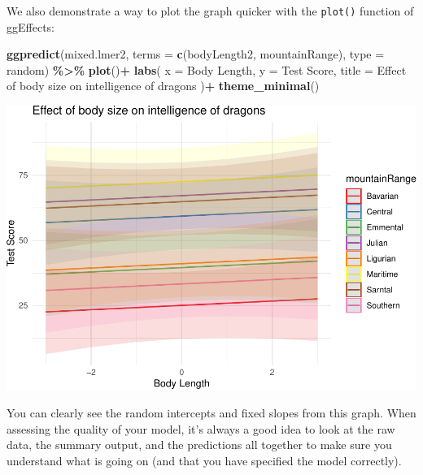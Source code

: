 \documentclass[
]{article}
\newenvironment{Shaded}{\begin{snugshade}}{\end{snugshade}}
\newcommand{\AttributeTok}[1]{\textcolor[rgb]{0.13,0.29,0.53}{#1}}
\newcommand{\FunctionTok}[1]{\textcolor[rgb]{0.13,0.29,0.53}{\textbf{#1}}}
\newcommand{\NormalTok}[1]{#1}
\newcommand{\SpecialCharTok}[1]{\textcolor[rgb]{0.81,0.36,0.00}{\textbf{#1}}}
\newcommand{\StringTok}[1]{\textcolor[rgb]{0.31,0.60,0.02}{#1}}
\begin{document}
We also demonstrate a way to plot the graph quicker with the
\texttt{plot()} function of ggEffects:

\begin{Shaded}
\begin{Highlighting}[]
\FunctionTok{ggpredict}\NormalTok{(mixed.lmer2, }\AttributeTok{terms =} \FunctionTok{c}\NormalTok{(}\StringTok{\textquotesingle{}bodyLength2\textquotesingle{}}\NormalTok{, }\StringTok{\textquotesingle{}mountainRange\textquotesingle{}}\NormalTok{), }\AttributeTok{type =} \StringTok{\textquotesingle{}random\textquotesingle{}}\NormalTok{) }\SpecialCharTok{\%\textgreater{}\%} 
  \FunctionTok{plot}\NormalTok{()}\SpecialCharTok{+}
  \FunctionTok{labs}\NormalTok{(}
    \AttributeTok{x =} \StringTok{\textquotesingle{}Body Length\textquotesingle{}}\NormalTok{,}
    \AttributeTok{y =} \StringTok{\textquotesingle{}Test Score\textquotesingle{}}\NormalTok{,}
    \AttributeTok{title =} \StringTok{\textquotesingle{}Effect of body size on intelligence of dragons\textquotesingle{}}
\NormalTok{  )}\SpecialCharTok{+}
  \FunctionTok{theme\_minimal}\NormalTok{()}
\end{Highlighting}
\end{Shaded}

\includegraphics{Introduction-to-linear-mixed-models_files/figure-latex/unnamed-chunk-26-1.pdf}

You can clearly see the random intercepts and fixed slopes from this
graph. When assessing the quality of your model, it's always a good idea
to look at the raw data, the summary output, and the predictions all
together to make sure you understand what is going on (and that you have
specified the model correctly).
\end{document}

